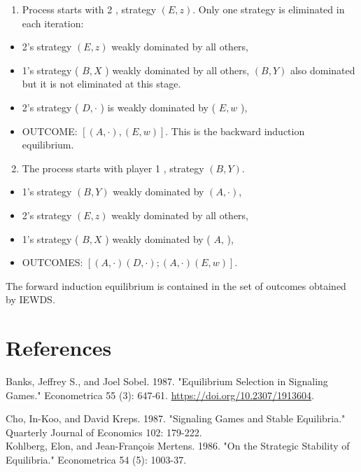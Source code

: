 \documentclass[10pt]{article}
\begin{document}
\begin{enumerate}
  \item Process starts with 2 , strategy $(E, z)$. Only one strategy is eliminated in each iteration:
\end{enumerate}

\begin{itemize}
  \item 2's strategy $(E, z)$ weakly dominated by all others,
  \item 1's strategy ( $B, X$ ) weakly dominated by all others, $(B, Y)$ also dominated but it is not eliminated at this stage.
  \item 2's strategy ( $D, \cdot$ ) is weakly dominated by ( $E, w$ ),
  \item OUTCOME: $[(A, \cdot),(E, w)]$. This is the backward induction equilibrium.
\end{itemize}

\begin{enumerate}
  \setcounter{enumi}{1}
  \item The process starts with player 1 , strategy $(B, Y)$.
\end{enumerate}

\begin{itemize}
  \item 1's strategy $(B, Y)$ weakly dominated by $(A, \cdot)$,
  \item 2's strategy $(E, z)$ weakly dominated by all others,
  \item 1's strategy ( $B, X$ ) weakly dominated by ( $A$, ),
  \item OUTCOMES: $[(A, \cdot)(D, \cdot) ;(A, \cdot)(E, w)]$.
\end{itemize}

The forward induction equilibrium is contained in the set of outcomes obtained by IEWDS.

\section*{References}
Banks, Jeffrey S., and Joel Sobel. 1987. "Equilibrium Selection in Signaling Games." Econometrica 55 (3): 647-61. \href{https://doi.org/10.2307/1913604}{https://doi.org/10.2307/1913604}.

Cho, In-Koo, and David Kreps. 1987. "Signaling Games and Stable Equilibria." Quarterly Journal of Economics 102: 179-222.\\
Kohlberg, Elon, and Jean-François Mertens. 1986. "On the Strategic Stability of Equilibria." Econometrica 54 (5): 1003-37.
\end{document}
